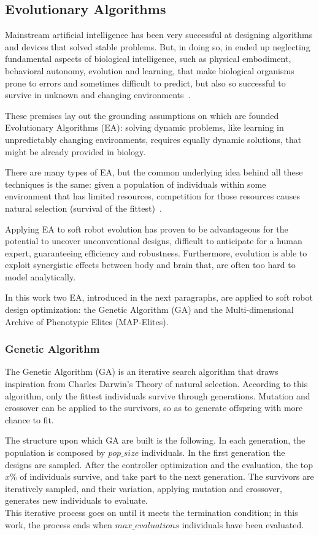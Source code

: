 \subsection{Evolutionary Algorithms}
Mainstream artificial intelligence has been very successful at designing algorithms and devices that solved stable problems. But, in doing so, in ended up neglecting fundamental aspects of biological intelligence, such as physical embodiment, behavioral autonomy, evolution and learning, that make biological organisms prone to errors and sometimes difficult to predict, but also so successful to survive in unknown and changing environments~\cite{Floreano2008}.

These premises lay out the grounding assumptions on which are founded Evolutionary Algorithms (EA): solving dynamic problems, like learning in unpredictably changing environments, requires equally dynamic solutions, that might be already provided in biology.

There are many types of EA, but the common underlying idea behind all these techniques is the same: given a population of individuals within some environment that has limited resources, competition for those resources causes natural selection (survival of the fittest)~\cite{Eiben2015}.

Applying EA to soft robot evolution has proven to be advantageous for the potential to uncover unconventional designs, difficult to anticipate for a human expert, guaranteeing efficiency and robustness.
Furthermore, evolution is able to exploit synergistic effects between body and brain that, are often too hard to model analytically.~\cite{10.1007/978-3-030-72699-7_14}

In this work two EA, introduced in the next paragraphs, are applied to soft robot design optimization: the Genetic Algorithm (GA) and the Multi-dimensional Archive of Phenotypic Elites (MAP-Elites).


\subsubsection{Genetic Algorithm}
The Genetic Algorithm (GA) is an iterative search algorithm that draws inspiration from Charles Darwin's Theory of natural selection. According to this algorithm, only the fittest individuals survive through generations. Mutation and crossover can be applied to the survivors, so as to generate offspring with more chance to fit.

The structure upon which GA are built is the following.
In each generation, the population is composed by $pop\_size$ individuals. In the first generation the designs are sampled. After the controller optimization and the evaluation, the top $x\%$  of individuals survive, and take part to the next generation. 
The survivors are iteratively sampled, and their variation, applying mutation and crossover, generates new individuals to evaluate.\\
This iterative process goes on until it meets the termination condition; in this work, the process ends when $max\_evaluations$ individuals have been evaluated.

